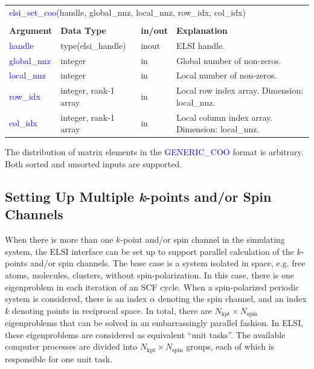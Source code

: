 \documentclass{report}
\newcommand{\tcb}[1]{\textcolor{blue}{#1}}
\begin{document}
\begin{tabular}[]{|p{30mm}|p{35mm}|p{15mm}|p{85mm}|}
\multicolumn{4}{l}{\tcb{elsi\_set\_coo}(handle, global\_nnz, local\_nnz, row\_idx, col\_idx)}\\
\multicolumn{4}{l}{}\\
\hline
\multicolumn{1}{|l|}{\textbf{Argument}} & \multicolumn{1}{l|}{\textbf{Data Type}} & \multicolumn{1}{l|}{\textbf{in/out}} & \multicolumn{1}{l|}{\textbf{Explanation}}\\
\hline
\tcb{handle}      & type(elsi\_handle)    & inout & ELSI handle.\\
\hline
\tcb{global\_nnz} & integer               & in    & Global number of non-zeros.\\
\hline
\tcb{local\_nnz}  & integer               & in    & Local number of non-zeros.\\
\hline
\tcb{row\_idx}    & integer, rank-1 array & in    & Local row index array. Dimension: local\_nnz.\\
\hline
\tcb{col\_idx}    & integer, rank-1 array & in    & Local column index array. Dimension: local\_nnz.\\
\hline
\end{tabular}

The distribution of matrix elements in the \tcb{GENERIC\_COO} format is arbitrary. Both sorted and unsorted inputs are supported.

\subsection{Setting Up Multiple \textit{k}-points and/or Spin Channels}
\label{subsec:setup_kpt}
When there is more than one $k$-point and/or spin channel in the simulating system, the ELSI interface can be set up to support parallel calculation of the $k$-points and/or spin channels. The base case is a system isolated in space, e.g. free atoms, molecules, clusters, without spin-polarization. In this case, there is one eigenproblem in each iteration of an SCF cycle. When a spin-polarized periodic system is considered, there is an index $\alpha$ denoting the spin channel, and an index $k$ denoting points in reciprocal space. In total, there are $N_\text{kpt} \times N_\text{spin}$ eigenproblems that can be solved in an embarrassingly parallel fashion. In ELSI, these eigenproblems are considered as equivalent ``unit tasks''. The available computer processes are divided into $N_\text{kpt} \times N_\text{spin}$ groups, each of which is responsible for one unit task.
\end{document}
